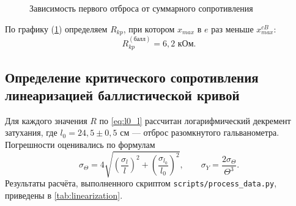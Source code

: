 \documentclass[a4paper,12pt]{article}
\begin{document}
\begin{figure}[!ht]
    \centering
    \caption{Зависимость первого отброса от суммарного сопротивления}
    \label{fig:ballistic_graph}
\end{figure}

По графику (\cref{fig:ballistic_graph}) определяем $R_{kp}$, при котором $x_{max}$ в $e$ раз меньше $x_{max}^{cB}$:
\begin{equation}
    R_{kp}^{(\text{балл})} = 6,2 \text{ кОм}.
\end{equation}

\subsection{Определение критического сопротивления линеаризацией баллистической кривой}

Для каждого значения $R$ по \cref{eq:l0_l} рассчитан логарифмический декремент затухания, где $l_0 = 24,5\pm0,5$ см --- отброс разомкнутого гальванометра. Погрешности оценивались по формулам
\begin{equation}
    \sigma_\Theta = 4\sqrt{\left(\frac{\sigma_l}{l}\right)^2 + \left(\frac{\sigma_{l_0}}{l_0}\right)^2},
    \qquad
    \sigma_Y = \frac{2\sigma_\Theta}{\Theta^3}.
\end{equation}
Результаты расчёта, выполненного скриптом \texttt{scripts/process\_data.py}, приведены в \cref{tab:linearization}.
\end{document}
